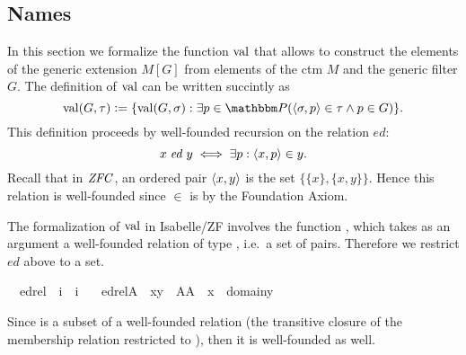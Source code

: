 \subsection{Names}
\label{sec:names}
In this section we formalize the function $\operatorname{val}$ that allows to
construct the elements of the generic extension $M[G]$ from elements
of the ctm $M$ and the generic filter $G$. The definition of $\operatorname{val}$
can be written succintly as
%
\begin{equation}\label{eq:def-val}
\val(G,\tau)\defi \{\val(G,\sigma) : \exists p\in \PP
(\lb\sigma,p\rb\in\tau \y p\in G)\}.
\end{equation}
%
This definition proceeds by well-founded recursion on the relation
$\mathit{ed}$:
\[
x \mathrel{\mathit{ed}} y \iff \exists p : \langle x,p\rangle\in y.
\]
Recall that in $\mathit{ZFC}$, an ordered pair $\langle x,y \rangle$ is the set
$\{\{x\},\{x,y\}\}$. Hence this relation is well-founded since $\in$
is by the Foundation Axiom.

The  formalization of $\operatorname{val}$ in Isabelle/ZF involves the function
, which takes as an argument a well-founded relation of
type , i.e.\ a set of pairs. Therefore we restrict
$\mathit{ed}$ above to a set.
%
\begin{isabelle}
\isamarkupfalse%
\isanewline
\ \ edrel\ {\isacharcolon}{\isacharcolon}\ {\isachardoublequoteopen}i\ {\isasymRightarrow}\ i{\isachardoublequoteclose}\ \isanewline
\ \ {\isachardoublequoteopen}edrel{\isacharparenleft}A{\isacharparenright}\ {\isacharequal}{\isacharequal}\ {\isacharbraceleft}{\isacharless}x{\isacharcomma}y{\isachargreater}\ {\isasymin}\ A{\isacharasterisk}A\ {\isachardot}\ x\ {\isasymin}\ domain{\isacharparenleft}y{\isacharparenright}{\isacharbraceright}{\isachardoublequoteclose}
\end{isabelle}
%
Since  is a subset of a  well-founded relation (the
transitive closure of the membership relation restricted to ),
then it is well-founded as well.

